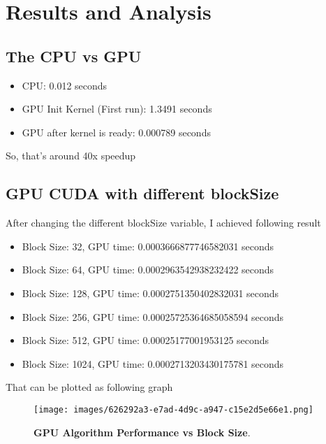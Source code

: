 \documentclass[12pt,a4paper]{cibb}
\begin{document}
\section{Results and Analysis}
\label{sec:CONCLUSIONS}

\subsection{The CPU vs GPU}
\begin{itemize}
    \item CPU: 0.012 seconds
    \item GPU Init Kernel (First run): 1.3491 seconds
    \item GPU after kernel is ready: 0.000789 seconds
\end{itemize}
So, that's around 40x speedup

\subsection{GPU CUDA with different blockSize}
After changing the different blockSize variable, I achieved following result
\begin{itemize}
    \item Block Size: 32, GPU time: 0.0003666877746582031 seconds
    \item Block Size: 64, GPU time: 0.0002963542938232422 seconds
    \item Block Size: 128, GPU time: 0.0002751350402832031 seconds
    \item Block Size: 256, GPU time: 0.00025725364685058594 seconds
    \item Block Size: 512, GPU time: 0.00025177001953125 seconds
    \item Block Size: 1024, GPU time: 0.0002713203430175781 seconds
\end{itemize}
That can be plotted as following graph
\begin{figure}[H]
\vspace{3mm}
 \begin{center}
 \texttt{[image: images/626292a3-e7ad-4d9c-a947-c15e2d5e66e1.png]}
\caption{\textbf{GPU Algorithm Performance vs Block Size}.
\label{fig:CIBB-LOGO}}
 \end{center}
\vspace{-8mm}
\end{figure}
\end{document}
